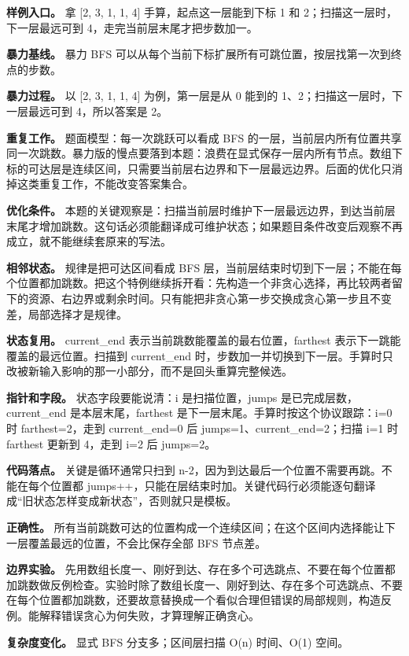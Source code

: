 \textbf{样例入口。} 拿 [2, 3, 1, 1, 4] 手算，起点这一层能到下标 1 和 2；扫描这一层时，下一层最远可到 4，走完当前层末尾才把步数加一。

\textbf{暴力基线。} 暴力 BFS 可以从每个当前下标扩展所有可跳位置，按层找第一次到终点的步数。

\textbf{暴力过程。} 以 [2, 3, 1, 1, 4] 为例，第一层是从 0 能到的 1、2；扫描这一层时，下一层最远可到 4，所以答案是 2。

\textbf{重复工作。} 题面模型：每一次跳跃可以看成 BFS 的一层，当前层内所有位置共享同一次跳数。暴力版的慢点要落到本题：浪费在显式保存一层内所有节点。数组下标的可达层是连续区间，只需要当前层右边界和下一层最远边界。后面的优化只消掉这类重复工作，不能改变答案集合。

\textbf{优化条件。} 本题的关键观察是：扫描当前层时维护下一层最远边界，到达当前层末尾才增加跳数。这句话必须能翻译成可维护状态；如果题目条件改变后观察不再成立，就不能继续套原来的写法。

\textbf{相邻状态。} 规律是把可达区间看成 BFS 层，当前层结束时切到下一层；不能在每个位置都加跳数。把这个特例继续拆开看：先构造一个非贪心选择，再比较两者留下的资源、右边界或剩余时间。只有能把非贪心第一步交换成贪心第一步且不变差，局部选择才是规律。

\textbf{状态复用。} current\_end 表示当前跳数能覆盖的最右位置，farthest 表示下一跳能覆盖的最远位置。扫描到 current\_end 时，步数加一并切换到下一层。手算时只改被新输入影响的那一小部分，而不是回头重算完整候选。

\textbf{指针和字段。} 状态字段要能说清：i 是扫描位置，jumps 是已完成层数，current\_end 是本层末尾，farthest 是下一层末尾。手算时按这个协议跟踪：i=0 时 farthest=2，走到 current\_end=0 后 jumps=1、current\_end=2；扫描 i=1 时 farthest 更新到 4，走到 i=2 后 jumps=2。

\textbf{代码落点。} 关键是循环通常只扫到 n-2，因为到达最后一个位置不需要再跳。不能在每个位置都 jumps++，只能在层结束时加。关键代码行必须能逐句翻译成“旧状态怎样变成新状态”，否则就只是模板。

\textbf{正确性。} 所有当前跳数可达的位置构成一个连续区间；在这个区间内选择能让下一层覆盖最远的位置，不会比保存全部 BFS 节点差。

\textbf{边界实验。} 先用数组长度一、刚好到达、存在多个可选跳点、不要在每个位置都加跳数做反例检查。实验时除了数组长度一、刚好到达、存在多个可选跳点、不要在每个位置都加跳数，还要故意替换成一个看似合理但错误的局部规则，构造反例。能解释错误贪心为何失败，才算理解正确贪心。

\textbf{复杂度变化。} 显式 BFS 分支多；区间层扫描 O(n) 时间、O(1) 空间。

